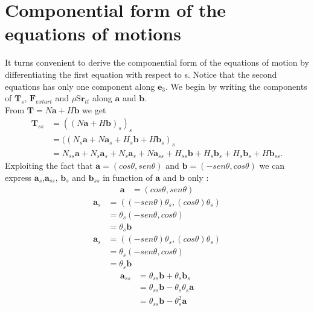 

\section{Componential form of the equations of motions}\label{componential-form-of-the-equations-of-motion}
It turns convenient to derive the componential form of the equations of motion by differentiating the first equation with respect to s.
Notice that the second equations has only one component along $\mathbf{e}_3$.
We begin by writing the components of $\mathbf{T}_s$, $\mathbf{F}_{extart}$ and $\rho$S$\mathbf{r}_{tt}$ along $\mathbf{a}$ and $\mathbf{b}$.\\
From $\mathbf{T}=N\mathbf{a}+H\mathbf{b}$ we get
\begin{equation}
\begin{split}
\mathbf{T}_{ss}& =((N\mathbf{a}+H\mathbf{b})_s)_s\\
               & =((N_s\mathbf{a}+ N\mathbf{a}_s + H_s\mathbf{b} + H\mathbf{b}_s)_s\\
               & = N_{ss}\mathbf{a} + N_s\mathbf{a}_s + N_s\mathbf{a}_s + N\mathbf{a}_{ss} + H_{ss}\mathbf{b} + H_s\mathbf{b}_s + H_s\mathbf{b}_s + H\mathbf{b}_{ss}.
\end{split}
\end{equation}
Exploiting the fact that $\mathbf{a}=(cos\theta, sen\theta)$ and $\mathbf{b}=(-sen\theta, cos\theta)$ we can express $\mathbf{a}_s$,$\mathbf{a}_{ss}$, $\mathbf{b}_s$ and $\mathbf{b}_{ss}$ in function of $\mathbf{a}$ and $\mathbf{b}$ only :
\begin{equation}
\begin{split}
\mathbf{a}& = (cos\theta, sen\theta)
\end{split}
\end{equation}
\begin{equation}
\begin{split}
\mathbf{a}_s& = ((-sen\theta)\theta_s, (cos\theta)\theta_s)\\
            & = \theta_s(-sen\theta, cos\theta)\\
            & =\theta_s\mathbf{b}
\end{split}
\end{equation}
\begin{equation}
\begin{split}
\mathbf{a}_s& = ((-sen\theta)\theta_s, (cos\theta)\theta_s)\\
            & = \theta_s(-sen\theta, cos\theta)\\
            & =\theta_s\mathbf{b}
\end{split}
\end{equation}
\begin{equation}
\begin{split}
\mathbf{a}_{ss}& = \theta_{ss}\mathbf{b}+\theta_s\mathbf{b}_s \\
            & = \theta_{ss}\mathbf{b} - \theta_s\theta_s\mathbf{a}\\
            & = \theta_{ss}\mathbf{b} - \theta_s^2\mathbf{a}
\end{split}
\end{equation}

 
 
 
 
 
 
  
  
  
  
  
  
  
  
  
  